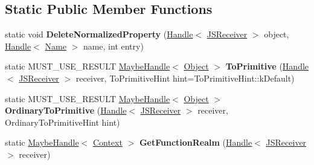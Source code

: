 \subsection*{Static Public Member Functions}
\begin{DoxyCompactItemize}
\item 
static void {\bfseries Delete\+Normalized\+Property} (\hyperlink{classv8_1_1internal_1_1_handle}{Handle}$<$ \hyperlink{classv8_1_1internal_1_1_j_s_receiver}{J\+S\+Receiver} $>$ object, \hyperlink{classv8_1_1internal_1_1_handle}{Handle}$<$ \hyperlink{classv8_1_1internal_1_1_name}{Name} $>$ name, int entry)\hypertarget{classv8_1_1internal_1_1_j_s_receiver_a49cbb74b5107515e9858df808190f036}{}\label{classv8_1_1internal_1_1_j_s_receiver_a49cbb74b5107515e9858df808190f036}

\item 
static M\+U\+S\+T\+\_\+\+U\+S\+E\+\_\+\+R\+E\+S\+U\+LT \hyperlink{classv8_1_1internal_1_1_maybe_handle}{Maybe\+Handle}$<$ \hyperlink{classv8_1_1internal_1_1_object}{Object} $>$ {\bfseries To\+Primitive} (\hyperlink{classv8_1_1internal_1_1_handle}{Handle}$<$ \hyperlink{classv8_1_1internal_1_1_j_s_receiver}{J\+S\+Receiver} $>$ receiver, To\+Primitive\+Hint hint=To\+Primitive\+Hint\+::k\+Default)\hypertarget{classv8_1_1internal_1_1_j_s_receiver_aae189c63893e7f2349bcb64464dd14be}{}\label{classv8_1_1internal_1_1_j_s_receiver_aae189c63893e7f2349bcb64464dd14be}

\item 
static M\+U\+S\+T\+\_\+\+U\+S\+E\+\_\+\+R\+E\+S\+U\+LT \hyperlink{classv8_1_1internal_1_1_maybe_handle}{Maybe\+Handle}$<$ \hyperlink{classv8_1_1internal_1_1_object}{Object} $>$ {\bfseries Ordinary\+To\+Primitive} (\hyperlink{classv8_1_1internal_1_1_handle}{Handle}$<$ \hyperlink{classv8_1_1internal_1_1_j_s_receiver}{J\+S\+Receiver} $>$ receiver, Ordinary\+To\+Primitive\+Hint hint)\hypertarget{classv8_1_1internal_1_1_j_s_receiver_aa4f9628aa2f37738678d0c8aec0f2d85}{}\label{classv8_1_1internal_1_1_j_s_receiver_aa4f9628aa2f37738678d0c8aec0f2d85}

\item 
static \hyperlink{classv8_1_1internal_1_1_maybe_handle}{Maybe\+Handle}$<$ \hyperlink{classv8_1_1internal_1_1_context}{Context} $>$ {\bfseries Get\+Function\+Realm} (\hyperlink{classv8_1_1internal_1_1_handle}{Handle}$<$ \hyperlink{classv8_1_1internal_1_1_j_s_receiver}{J\+S\+Receiver} $>$ receiver)\hypertarget{classv8_1_1internal_1_1_j_s_receiver_a0a77f95a817b226a08074b6ab5a31f96}{}\label{classv8_1_1internal_1_1_j_s_receiver_a0a77f95a817b226a08074b6ab5a31f96}


\end{DoxyCompactItemize}
